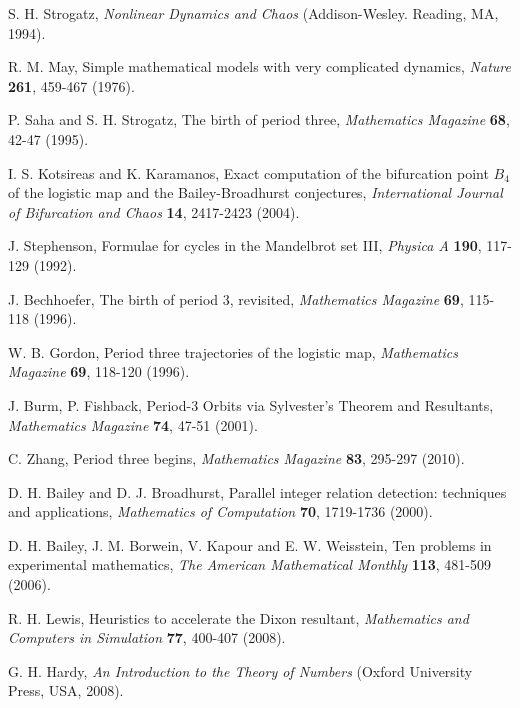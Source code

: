 \documentclass[preprint]{revtex4-1}
\begin{document}
\begin{thebibliography}{50}


 S. H. Strogatz,
  \textit{Nonlinear Dynamics and Chaos}
  (Addison-Wesley. Reading, MA, 1994).

 R. M. May,
  Simple mathematical models with very complicated dynamics,
  \textit{Nature}
  \textbf{261},
  459-467
  (1976).

 P. Saha and S. H. Strogatz,
  The birth of period three,
  \textit{Mathematics Magazine}
  \textbf{68},
  42-47
  (1995).

 I. S. Kotsireas and K. Karamanos,
  Exact computation of the bifurcation point $B_4$ of the logistic map and
    the Bailey-Broadhurst conjectures,
  \textit{International Journal of Bifurcation and Chaos}
  \textbf{14},
  2417-2423
  (2004).

 J. Stephenson,
  Formulae for cycles in the Mandelbrot set III,
  \textit{Physica A}
  \textbf{190},
  117-129
  (1992).

 J. Bechhoefer,
  The birth of period 3, revisited,
  \textit{Mathematics Magazine}
  \textbf{69},
  115-118
  (1996).

 W. B. Gordon,
  Period three trajectories of the logistic map,
  \textit{Mathematics Magazine}
  \textbf{69},
  118-120
  (1996).

 J. Burm, P. Fishback,
  Period-3 Orbits via Sylvester's Theorem and Resultants,
  \textit{Mathematics Magazine}
  \textbf{74},
  47-51
  (2001).

 C. Zhang,
  Period three begins,
  \textit{Mathematics Magazine}
  \textbf{83},
  295-297
  (2010).

 D. H. Bailey and D. J. Broadhurst,
  Parallel integer relation detection: techniques and applications,
  \textit{Mathematics of Computation}
  \textbf{70},
  1719-1736
  (2000).

 D. H. Bailey, J. M. Borwein, V. Kapour and E. W. Weisstein,
  Ten problems in experimental mathematics,
  \textit{The American Mathematical Monthly}
  \textbf{113},
  481-509
  (2006).

 R. H. Lewis,
  Heuristics to accelerate the Dixon resultant,
  \textit{Mathematics and Computers in Simulation}
  \textbf{77},
  400-407
  (2008).

 G. H. Hardy,
  \textit{An Introduction to the Theory of Numbers}
  (Oxford University Press, USA, 2008).


\end{thebibliography}
\end{document}
